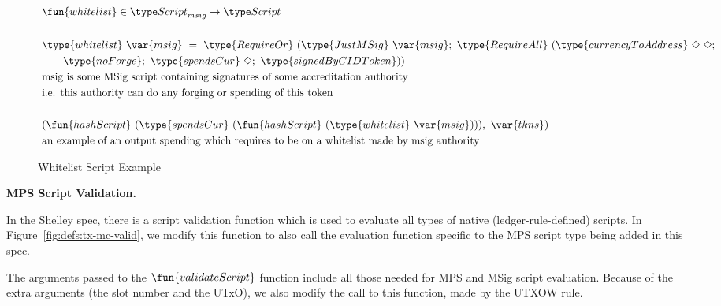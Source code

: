 \begin{figure*}[htb]
  \begin{align*}
    & \fun{whitelist} \in\ScriptMSig\to\Script  \\~\\
    & \type{whitelist}  ~\var{msig}~ =~ \type{RequireOr}~ (\type{JustMSig}~\var{msig};~
    \type{RequireAll}~(\type{currencyToAddress}~\Nothing~\Nothing ;\\
    &~~~~~~ \type{noForge};~\type{spendsCur}~\Nothing;~\type{signedByCIDToken})) \\
    & \text{msig is some MSig script containing signatures of some accreditation authority} \\
    & \text{i.e. this authority can do any forging or spending of this token} \\~\\
    & (\fun{hashScript}~(\type{spendsCur}~(\fun{hashScript}~(\type{whitelist}~\var{msig}))),~ \var{tkns}) \\
    & \text{an example of an output spending which requires to be on a whitelist made by msig authority}
  \end{align*}
  \caption{Whitelist Script Example}
  \label{fig:whitelist-example}
\end{figure*}

\textbf{MPS Script Validation.}

In the Shelley spec, there is a script validation function which
is used to evaluate all types of native (ledger-rule-defined) scripts.
In Figure~\ref{fig:defs:tx-mc-valid}, we modify this function to also call the
evaluation function specific to the MPS script type being added in this spec.

The arguments passed to the $\fun{validateScript}$ function include all those
needed for MPS and MSig script evaluation. Because of the extra arguments
(the slot number and the UTxO), we also modify the call to this function, made
by the UTXOW rule.

